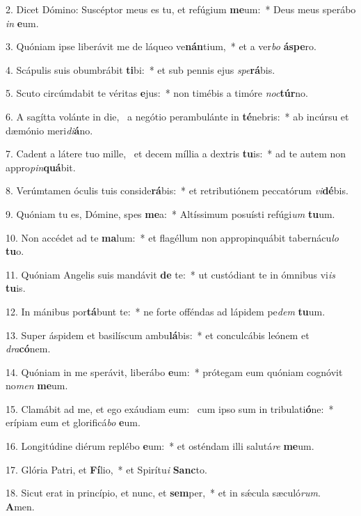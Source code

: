 2. Dicet Dómino: Suscéptor meus es tu, et refúgium \textbf{me}um:~*  Deus meus sperábo \textit{in} \textbf{e}um.\

3. Quóniam ipse liberávit me de láqueo ve\textbf{nán}tium,~*  et a ver\textit{bo} \textbf{ás}\textbf{pe}ro.\

4. Scápulis suis obumbrábit \textbf{ti}bi:~*  et sub pennis ejus \textit{spe}\textbf{rá}bis.\

5. Scuto circúmdabit te véritas \textbf{e}jus:~*  non timébis a timóre \textit{noc}\textbf{túr}no.\

6. A sagítta volánte in die, \dag\  a negótio perambulánte in \textbf{té}nebris:~*  ab incúrsu et dæmónio meri\textit{di}\textbf{á}no.\

7. Cadent a látere tuo mille, \dag\  et decem míllia a dextris \textbf{tu}is:~*  ad te autem non appro\textit{pin}\textbf{quá}bit.\

8. Verúmtamen óculis tuis conside\textbf{rá}bis:~*  et retributiónem peccatórum \textit{vi}\textbf{dé}bis.\

9. Quóniam tu es, Dómine, spes \textbf{me}a:~*  Altíssimum posuísti refúgi\textit{um} \textbf{tu}um.\

10. Non accédet ad te \textbf{ma}lum:~*  et flagéllum non appropinquábit tabernácu\textit{lo} \textbf{tu}o.\

11. Quóniam Angelis suis mandávit \textbf{de} te:~*  ut custódiant te in ómnibus vi\textit{is} \textbf{tu}is.\

12. In mánibus por\textbf{tá}bunt te:~*  ne forte offéndas ad lápidem pe\textit{dem} \textbf{tu}um.\

13. Super áspidem et basilíscum ambu\textbf{lá}bis:~*  et conculcábis leónem et \textit{dra}\textbf{có}nem.\

14. Quóniam in me sperávit, liberábo \textbf{e}um:~*  prótegam eum quóniam cognóvit no\textit{men} \textbf{me}um.\

15. Clamábit ad me, et ego exáudiam eum: \dag\  cum ipso sum in tribulati\textbf{ó}ne:~*  erípiam eum et glorificá\textit{bo} \textbf{e}um.\

16. Longitúdine diérum replébo \textbf{e}um:~*  et osténdam illi salutá\textit{re} \textbf{me}um.\

17. Glória Patri, et \textbf{Fí}lio,~*  et Spirítu\textit{i} \textbf{Sanc}to.\

18. Sicut erat in princípio, et nunc, et \textbf{sem}per,~*  et in sǽcula sæculó\textit{rum}. \textbf{A}men.\

